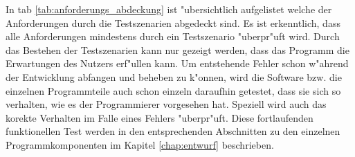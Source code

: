 In \ac{tab} \ref{tab:anforderungs_abdeckung} ist "ubersichtlich aufgelistet welche der Anforderungen durch die Testszenarien abgedeckt sind.
Es ist erkenntlich, dass alle Anforderungen mindestens durch ein Testszenario "uberpr"uft wird.
Durch das Bestehen der Testszenarien kann nur gezeigt werden, dass das Programm die Erwartungen des Nutzers erf"ullen kann.
Um entstehende Fehler schon w"ahrend der Entwicklung abfangen und beheben zu k"onnen, wird die Software bzw. die einzelnen Programmteile auch schon einzeln daraufhin getestet, dass sie sich so verhalten, wie es der Programmierer vorgesehen hat.
Speziell wird auch das korekte Verhalten im Falle eines Fehlers "uberpr"uft.
Diese fortlaufenden funktionellen Test werden in den entsprechenden Abschnitten zu den einzelnen Programmkomponenten im Kapitel \ref{chap:entwurf} beschrieben.

